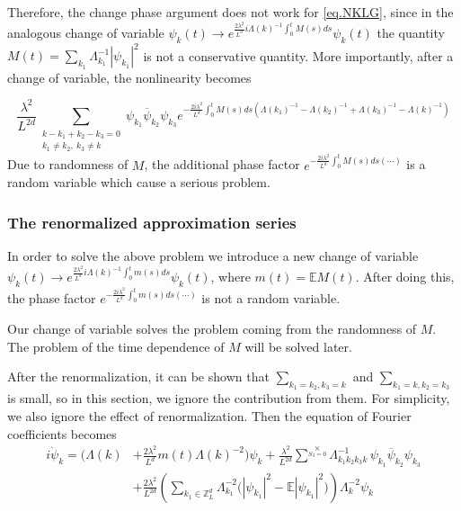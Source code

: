Therefore, the change phase argument does not work for \eqref{eq.NKLG}, since in the analogous change of variable $\psi_k(t)\rightarrow e^{\frac{2\lambda^2}{L^{d}} i \Lambda(k)^{-1}\int^t_{0}M(s) ds} \psi_k(t)$ the quantity $M(t)=\sum_{k_1}\Lambda_{k_1}^{-1}|\psi_{k_1}|^2$ is not a conservative quantity. More importantly, after a change of variable, the nonlinearity becomes

\begin{equation}
\frac{\lambda^2}{L^{2d}} \sum\limits_{\substack{k - k_1 + k_2 -k_3 = 0 \\ k_1\ne k_2,\ k_3 \ne k}} \psi_{k_1}\overline{\psi}_{k_2} \psi_{k_3} e^{- \frac{2i\lambda^2}{L^{d}} \int^t_{0}M(s) ds\left(\Lambda(k_1)^{-1}-\Lambda(k_2)^{-1}+\Lambda(k_3)^{-1}-\Lambda(k)^{-1}\right)} 
\end{equation}
Due to randomness of $M$, the additional phase factor $e^{- \frac{2i\lambda^2}{L^{d}} \int^t_{0}M(s) ds(\cdots)}$ is a random variable which cause a serious problem. 


\subsubsection{The renormalized approximation series} \label{sec.appsol}%


In order to solve the above problem we introduce a new change of variable $\psi_k(t)\rightarrow e^{\frac{2\lambda^2}{L^{d}} i \Lambda(k)^{-1}\int^t_{0}m(s) ds} \psi_k(t)$, where $m(t)=\mathbb{E}M(t)$. After doing this, the phase factor $e^{- \frac{2i\lambda^2}{L^{d}} \int^t_{0}m(s) ds(\cdots)}$ is not a random variable. 

Our change of variable solves the problem coming from the randomness of $M$. The problem of the time dependence of $M$ will be solved later.

After the renormalization, it can be shown that $\sum_{k_1=k_2,k_3=k}$ and $\sum_{k_1=k,k_2=k_3}$ is small, so in this section, we ignore the contribution from them. For simplicity, we also ignore the effect of renormalization. Then the equation of Fourier coefficients becomes
\begin{equation}\label{eq.renormalizedintro}
 \begin{split}
 i \dot{\psi}_{k} 
 = \bigg(\Lambda(k)&+\frac{2\lambda^2}{L^{d}} m(t)\Lambda(k)^{-2}\bigg) \psi_k
 +\frac{\lambda^2}{L^{2d}} \sum^{\times}\limits_{S_3=0} \Lambda_{k_1k_2k_3k}^{-1}\,\psi_{k_1}\overline{\psi}_{k_2} \psi_{k_3}
 \\
 &+\frac{2\lambda^2}{L^{2d}} \left(\sum\limits_{k_1\in \mathbb{Z}^d_L} \Lambda_{k_1}^{-2}\Big(|\psi_{k_1}|^2-\mathbb{E} |\psi_{k_1}|^2\Big) \right) \Lambda_{k}^{-2}\psi_{k} 
 \end{split}
 \end{equation}

